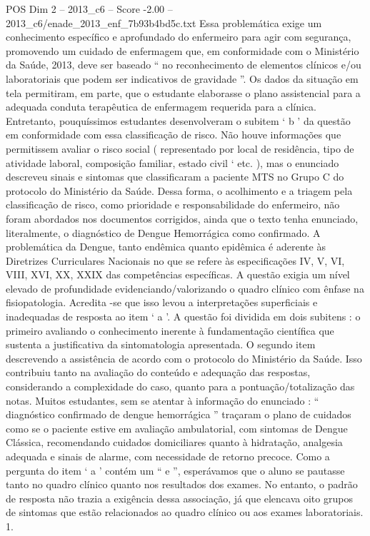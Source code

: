 \begin{textsample}{POS Dim 2 – 2013\_c6 – Score -2.00 – 2013\_c6/enade\_2013\_enf\_7b93b4bd5c.txt}
Essa problemática exige um conhecimento específico e aprofundado do enfermeiro para agir com segurança, promovendo um cuidado de enfermagem que, em conformidade com o Ministério da Saúde, 2013, deve ser baseado “ no reconhecimento de elementos clínicos e/ou laboratoriais que podem ser indicativos de gravidade ”.
Os dados da situação em tela permitiram, em parte, que o estudante elaborasse o plano assistencial para a adequada conduta terapêutica de enfermagem requerida para a clínica.
Entretanto, pouquíssimos estudantes desenvolveram o subitem ‘ b ’ da questão em conformidade com essa classificação de risco.
Não houve informações que permitissem avaliar o risco social ( representado por local de residência, tipo de atividade laboral, composição familiar, estado civil ‘ etc. ), mas o enunciado descreveu sinais e sintomas que classificaram a paciente MTS no Grupo C do protocolo do Ministério da Saúde.
Dessa forma, o acolhimento e a triagem pela classificação de risco, como prioridade e responsabilidade do enfermeiro, não foram abordados nos documentos corrigidos, ainda que o texto tenha enunciado, literalmente, o diagnóstico de Dengue Hemorrágica como confirmado.
A problemática da Dengue, tanto endêmica quanto epidêmica é aderente às Diretrizes Curriculares Nacionais no que se refere às especificações IV, V, VI, VIII, XVI, XX, XXIX das competências específicas.
A questão exigia um nível elevado de profundidade evidenciando/valorizando o quadro clínico com ênfase na fisiopatologia.
Acredita -se que isso levou a interpretações superficiais e inadequadas de resposta ao item ‘ a ’.
A questão foi dividida em dois subitens : o primeiro avaliando o conhecimento inerente à fundamentação científica que sustenta a justificativa da sintomatologia apresentada.
O segundo item descrevendo a assistência de acordo com o protocolo do Ministério da Saúde.
Isso contribuiu tanto na avaliação do conteúdo e adequação das respostas, considerando a complexidade do caso, quanto para a pontuação/totalização das notas.
Muitos estudantes, sem se atentar à informação do enunciado : “ diagnóstico confirmado de dengue hemorrágica ” traçaram o plano de cuidados como se o paciente estive em avaliação ambulatorial, com sintomas de Dengue Clássica, recomendando cuidados domiciliares quanto à hidratação, analgesia adequada e sinais de alarme, com necessidade de retorno precoce.
Como a pergunta do item ‘ a ’ contém um “ e ”, esperávamos que o aluno se pautasse tanto no quadro clínico quanto nos resultados dos exames.
No entanto, o padrão de resposta não trazia a exigência dessa associação, já que elencava oito grupos de sintomas que estão relacionados ao quadro clínico ou aos exames laboratoriais. 1.

\end{textsample}
